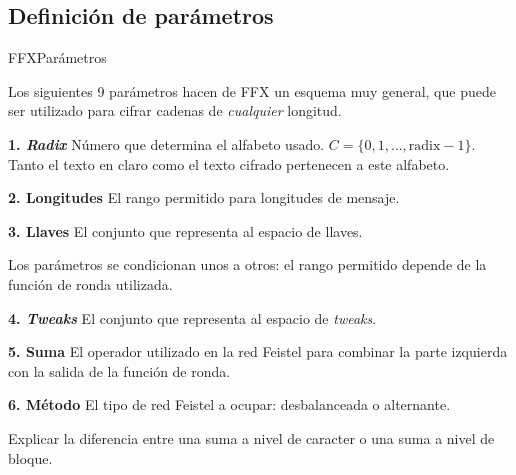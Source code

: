 %
%

\subsection{Definición de parámetros}

\begin{frame}{FFX}{Parámetros}

  Los siguientes 9 parámetros hacen de FFX un esquema muy general, que
  puede ser utilizado para cifrar cadenas de \textit{cualquier} longitud.

  {
    \begin{block}{\textbf{1. \textit{Radix}}}
      Número que determina el alfabeto usado.
      $ C = \{ 0, 1, \dots, \text{radix} - 1\} $. Tanto el texto en claro como
      el texto cifrado pertenecen a este alfabeto.
    \end{block}

    \begin{block}{\textbf{2. Longitudes}}
      El rango permitido para longitudes de mensaje.
    \end{block}

    \begin{block}{\textbf{3. Llaves}}
      El conjunto que representa al espacio de llaves.
    \end{block}
  }

  {
    Los parámetros se condicionan unos a otros: el rango permitido depende
    de la función de ronda utilizada.
  }

  {
    \begin{block}{\textbf{4. \textit{Tweaks}}}
      El conjunto que representa al espacio de \textit{tweaks}.
    \end{block}

    \begin{block}{\textbf{5. Suma}}
      El operador utilizado en la red Feistel para combinar la parte izquierda
      con la salida de la función de ronda.
    \end{block}

    \begin{block}{\textbf{6. Método}}
      El tipo de red Feistel a ocupar: desbalanceada o alternante.
    \end{block}
  }

  {
    Explicar la diferencia entre una suma a nivel de caracter o una suma a
    nivel de bloque.

}
\end{frame}
